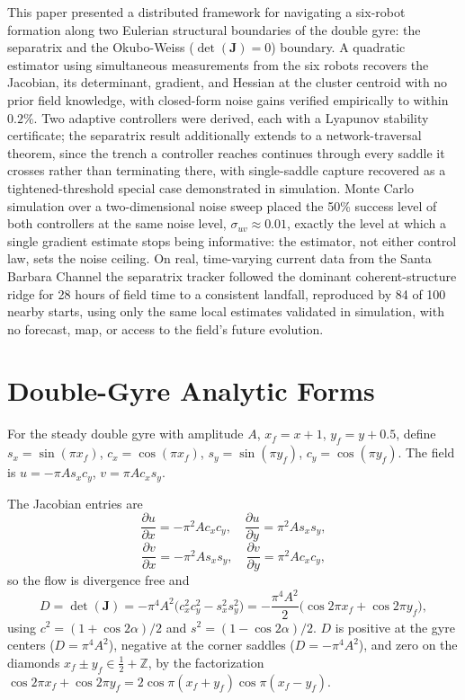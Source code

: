 \documentclass[lettersize,journal]{IEEEtran}
\begin{document}
This paper presented a distributed framework for navigating a six-robot
formation along two Eulerian structural boundaries of the double gyre: the
separatrix and the Okubo-Weiss ($\det(\mathbf{J}) = 0$) boundary. A quadratic
estimator using simultaneous measurements from the six robots recovers the
Jacobian, its determinant, gradient, and Hessian at the cluster centroid with
no prior field knowledge, with closed-form noise gains verified empirically
to within $0.2\%$. Two adaptive controllers were derived, each with a
Lyapunov stability certificate; the separatrix result additionally extends
to a network-traversal theorem, since the trench a controller reaches
continues through every saddle it crosses rather than terminating there,
with single-saddle capture recovered as a tightened-threshold special case
demonstrated in simulation. Monte Carlo simulation over a two-dimensional
noise sweep placed the 50\% success level of both controllers at the same
noise level, $\sigma_{uv} \approx 0.01$, exactly the level at which a
single gradient estimate stops being informative: the estimator, not
either control law, sets the noise ceiling. On real, time-varying current
data from the Santa Barbara Channel the separatrix tracker followed the
dominant coherent-structure ridge for 28 hours of field time to a
consistent landfall, reproduced by 84 of 100 nearby starts, using only
the same local estimates validated in simulation, with no forecast, map,
or access to the field's future evolution.


\appendices

\section{Double-Gyre Analytic Forms}
\label{app:analytic}

For the steady double gyre with amplitude $A$, $x_f = x + 1$,
$y_f = y + 0.5$, define $s_x = \sin(\pi x_f)$, $c_x = \cos(\pi x_f)$,
$s_y = \sin(\pi y_f)$, $c_y = \cos(\pi y_f)$. The field is
$u = -\pi A s_x c_y$, $v = \pi A c_x s_y$.

The Jacobian entries are
\begin{equation}
    \frac{\partial u}{\partial x} = -\pi^2 A c_x c_y, \quad
    \frac{\partial u}{\partial y} =  \pi^2 A s_x s_y,
\end{equation}
\begin{equation}
    \frac{\partial v}{\partial x} = -\pi^2 A s_x s_y, \quad
    \frac{\partial v}{\partial y} =  \pi^2 A c_x c_y,
\end{equation}
so the flow is divergence free and
\begin{equation}
    D = \det(\mathbf{J})
      = -\pi^4 A^2 \bigl(c_x^2 c_y^2 - s_x^2 s_y^2\bigr)
      = -\frac{\pi^4 A^2}{2}\bigl(\cos 2\pi x_f + \cos 2\pi y_f\bigr),
    \label{eq:det_analytic}
\end{equation}
using $c^2 = (1+\cos 2\alpha)/2$ and $s^2 = (1-\cos 2\alpha)/2$. $D$ is
positive at the gyre centers ($D = \pi^4 A^2$), negative at the corner
saddles ($D = -\pi^4 A^2$), and zero on the diamonds
$x_f \pm y_f \in \tfrac{1}{2} + \mathbb{Z}$, by the factorization
$\cos 2\pi x_f + \cos 2\pi y_f = 2\cos\pi(x_f+y_f)\cos\pi(x_f-y_f)$.
\end{document}
